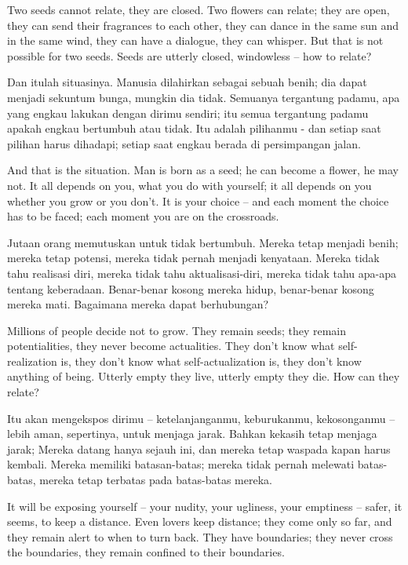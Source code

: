 \english
Two seeds cannot relate, they are closed. Two flowers can relate; they are open, they can send their fragrances to each other, they can dance in the same sun and in the same wind, they can have a dialogue, they can whisper. But that is not possible for two seeds. Seeds are utterly closed, windowless -- how to relate?

\bahasa
Dan itulah situasinya. Manusia dilahirkan sebagai sebuah benih; dia dapat menjadi sekuntum bunga, mungkin dia tidak. Semuanya tergantung padamu, apa yang engkau lakukan dengan dirimu sendiri; itu semua tergantung padamu apakah engkau bertumbuh atau tidak. Itu adalah pilihanmu - dan setiap saat pilihan harus dihadapi; setiap saat engkau berada di persimpangan jalan.

\english
And that is the situation. Man is born as a seed; he can become a flower, he may not. It all depends on you, what you do with yourself; it all depends on you whether you grow or you don't. It is your choice -- and each moment the choice has to be faced; each moment you are on the crossroads.

\bahasa
Jutaan orang memutuskan untuk tidak bertumbuh. Mereka tetap menjadi benih; mereka tetap potensi, mereka tidak pernah menjadi kenyataan. Mereka tidak tahu realisasi diri, mereka tidak tahu aktualisasi-diri, mereka tidak tahu apa-apa tentang keberadaan. Benar-benar kosong mereka hidup, benar-benar kosong mereka mati. Bagaimana mereka dapat berhubungan?

\english
Millions of people decide not to grow. They remain seeds; they remain potentialities, they never become actualities. They don't know what self-realization is, they don't know what self-actualization is, they don't know anything of being. Utterly empty they live, utterly empty they die. How can they relate?

\bahasa
Itu akan mengekspos dirimu -- ketelanjanganmu, keburukanmu, kekosonganmu -- lebih aman, sepertinya, untuk menjaga jarak. Bahkan kekasih tetap menjaga jarak; Mereka datang hanya sejauh ini, dan mereka tetap waspada kapan harus kembali. Mereka memiliki batasan-batas; mereka tidak pernah melewati batas-batas, mereka tetap terbatas pada batas-batas mereka.

\english
It will be exposing yourself -- your nudity, your ugliness, your emptiness -- safer, it seems, to keep a distance. Even lovers keep distance; they come only so far, and they remain alert to when to turn back. They have boundaries; they never cross the boundaries, they remain confined to their boundaries.

